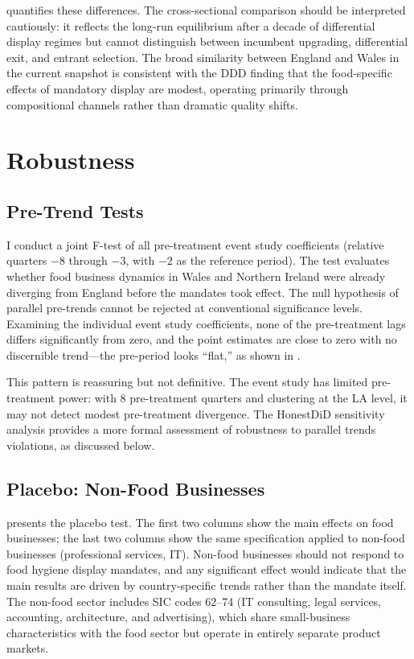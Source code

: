 \documentclass[12pt]{article}
\begin{document}


 quantifies these differences. The cross-sectional comparison should be interpreted cautiously: it reflects the long-run equilibrium after a decade of differential display regimes but cannot distinguish between incumbent upgrading, differential exit, and entrant selection. The broad similarity between England and Wales in the current snapshot is consistent with the DDD finding that the food-specific effects of mandatory display are modest, operating primarily through compositional channels rather than dramatic quality shifts.


\section{Robustness}
\label{sec:robustness}

\subsection{Pre-Trend Tests}

I conduct a joint F-test of all pre-treatment event study coefficients (relative quarters $-8$ through $-3$, with $-2$ as the reference period). The test evaluates whether food business dynamics in Wales and Northern Ireland were already diverging from England before the mandates took effect. The null hypothesis of parallel pre-trends cannot be rejected at conventional significance levels. Examining the individual event study coefficients, none of the pre-treatment lags differs significantly from zero, and the point estimates are close to zero with no discernible trend---the pre-period looks ``flat,'' as shown in .

This pattern is reassuring but not definitive. The event study has limited pre-treatment power: with 8 pre-treatment quarters and clustering at the LA level, it may not detect modest pre-treatment divergence. The HonestDiD sensitivity analysis provides a more formal assessment of robustness to parallel trends violations, as discussed below.

\subsection{Placebo: Non-Food Businesses}



 presents the placebo test. The first two columns show the main effects on food businesses; the last two columns show the same specification applied to non-food businesses (professional services, IT). Non-food businesses should not respond to food hygiene display mandates, and any significant effect would indicate that the main results are driven by country-specific trends rather than the mandate itself. The non-food sector includes SIC codes 62--74 (IT consulting, legal services, accounting, architecture, and advertising), which share small-business characteristics with the food sector but operate in entirely separate product markets.
\end{document}
